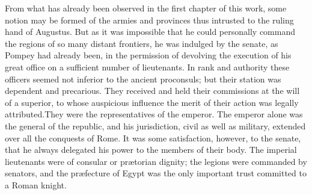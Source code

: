 

From what has already been observed in the first chapter of this
work, some notion may be formed of the armies and provinces thus
intrusted to the ruling hand of Augustus. But as it was
impossible that he could personally command the regions of so
many distant frontiers, he was indulged by the senate, as Pompey
had already been, in the permission of devolving the execution of
his great office on a sufficient number of lieutenants. In rank
and authority these officers seemed not inferior to the ancient
proconsuls; but their station was dependent and precarious. They
received and held their commissions at the will of a superior, to
whose auspicious influence the merit of their action was legally
attributed.\footnotemark[10] They were the representatives of the emperor. The
emperor alone was the general of the republic, and his
jurisdiction, civil as well as military, extended over all the
conquests of Rome. It was some satisfaction, however, to the
senate, that he always delegated his power to the members of
their body. The imperial lieutenants were of consular or
prætorian dignity; the legions were commanded by senators, and
the præfecture of Egypt was the only important trust committed to
a Roman knight.


